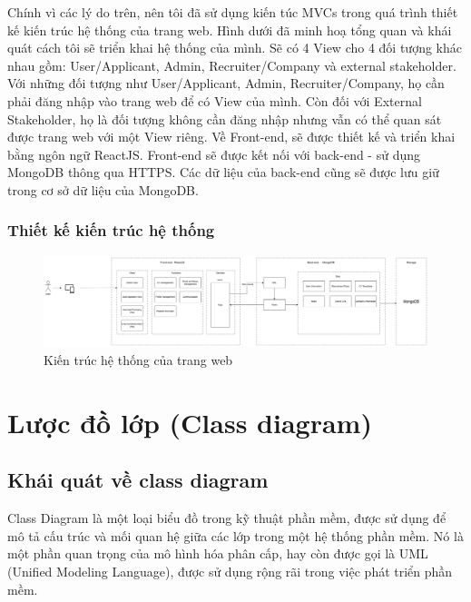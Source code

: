 Chính vì các lý do trên, nên tôi đã sử dụng kiến túc MVCs trong quá trình thiết kế kiến trúc hệ thống của trang web. Hình dưới đã minh hoạ tổng quan và khái quát cách tôi sẽ triển khai hệ thống của mình. Sẽ có 4 View cho 4 đối tượng khác nhau gồm: User/Applicant, Admin, Recruiter/Company và external stakeholder. Với những đối tượng như User/Applicant, Admin, Recruiter/Company, họ cần phải đăng nhập vào trang web để có View của mình. Còn đối với External Stakeholder, họ là đối tượng không cần đăng nhập nhưng vẫn có thể quan sát được trang web với một View riêng. Về Front-end, sẽ được thiết kế và triển khai bằng ngôn ngữ ReactJS. Front-end sẽ được kết nối với back-end - sử dụng MongoDB thông qua HTTPS. Các dữ liệu của back-end cũng sẽ được lưu giữ trong cơ sở dữ liệu của MongoDB.

\subsubsection{Thiết kế kiến trúc hệ thống}

\begin{figure}[H]

	\centering
    \includegraphics[angle=90,scale=0.07]{img/system_architecture.png}
    \caption{Kiến trúc hệ thống của trang web}
\end{figure}




\section{Lược đồ lớp (Class diagram)}

\subsection{Khái quát về class diagram}

Class Diagram là một loại biểu đồ trong kỹ thuật phần mềm, được sử dụng để mô tả cấu trúc và mối quan hệ giữa các lớp trong một hệ thống phần mềm. Nó là một phần quan trọng của mô hình hóa phân cấp, hay còn được gọi là UML (Unified Modeling Language), được sử dụng rộng rãi trong việc phát triển phần mềm.

